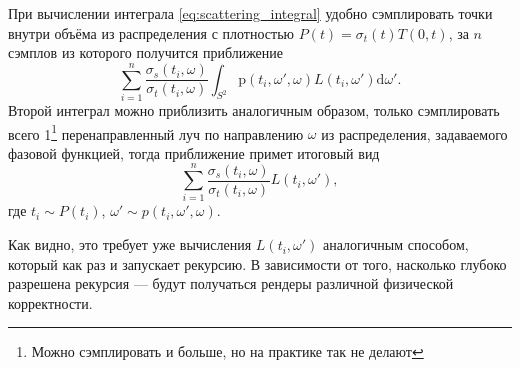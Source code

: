 При вычислении интеграла \ref{eq:scattering_integral} удобно сэмплировать точки внутри объёма из распределения с плотностью $P(t) = \sigma_t(t) T(0, t)$, за $n$ сэмплов из которого получится приближение
%
\[
	\sum_{i=1}^n \frac{\sigma_s (t_i, \omega)}{\sigma_t (t_i, \omega)}
	\int_{S^2} \mathrm p(t_i, \omega', \omega) L(t_i, \omega') \mathrm d\omega'.
\]
%
Второй интеграл можно приблизить аналогичным образом, только сэмплировать всего 1\footnote{Можно сэмплировать и больше, но на практике так не делают} перенаправленный луч по направлению $\omega$ из распределения, задаваемого фазовой функцией, тогда приближение примет итоговый вид
%
\[
	\sum_{i=1}^n \frac{\sigma_s (t_i, \omega)}{\sigma_t (t_i, \omega)} L(t_i, \omega'),
\]
%
где $t_i \sim P(t_i)$, $\omega' \sim p(t_i, \omega', \omega)$.

Как видно, это требует уже вычисления $L(t_i, \omega')$ аналогичным способом, который как раз и запускает рекурсию. В зависимости от того, насколько глубоко разрешена рекурсия --- будут получаться рендеры различной физической корректности.